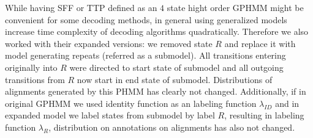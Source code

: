 While having SFF or TTP defined as an $4$ state hight order GPHMM might be
convenient for some decoding methods, in general using generalized models
increase time complexity of decoding algorithms quadratically. Therefore we
also worked with their expanded versions: we removed state $R$ and replace it
with model generating repeats (referred as a submodel). All transitions
entering originally into $R$ were directed to start state of submodel and all
outgoing transitions from $R$ now start in end state of submodel. Distributions
of alignments generated by this PHMM has clearly not changed. Additionally, if
in original GPHMM we used identity function as an labeling function
$\lambda_{ID}$ and in expanded model we label states from submodel by label
$R$, resulting in labeling function $\lambda_R$, distribution on annotations
on alignments has also not changed. 


